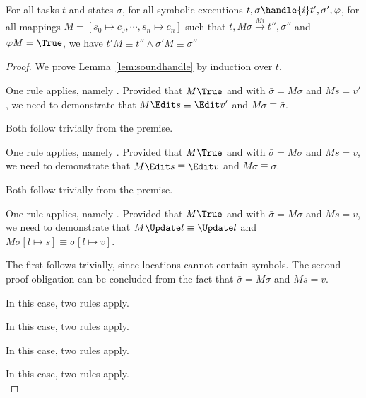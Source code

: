 \begin{lemma}
  \label{lem:soundhandle}

  For all tasks $t$ and states $\sigma$,
  for all symbolic executions $t,\sigma\handle{i} t',\sigma',\phi$,
  for all mappings $M = [s_0\mapsto c_0,\cdots,s_n\mapsto c_n]$
  such that $t,M \sigma \xrightarrow[]{M i} t'',\sigma''$ and $\phi M = \True$,
  we have $t'M \equiv t'' \wedge \sigma' M \equiv \sigma''$
\end{lemma}

\begin{proof}
  We prove Lemma~\ref{lem:soundhandle} by induction over $t$.\\

    {One rule applies, namely .
    Provided that $M\True$ and  with $\bar{\sigma}=M\sigma$ and $M s = v'$,
    we need to demonstrate that $M \Edit s\equiv \Edit v'$ and $ M\sigma\equiv \bar{\sigma}$.

    Both follow trivially from the premise.

    }

  {One rule applies, namely .
  Provided that $M\True$ and  with $\bar{\sigma}=M\sigma$ and $M s = v$,
  we need to demonstrate that $M \Edit s \equiv \Edit v$ and $ M\sigma\equiv \bar{\sigma}$.

  Both follow trivially from the premise.

  }

  {One rule applies, namely .
  Provided that $M\True$ and  with $\bar{\sigma}=M\sigma$ and $M s = v$,
  we need to demonstrate that $M \Update l \equiv \Update l$ and $ M\sigma[l\mapsto s]\equiv \bar{\sigma}[l\mapsto v]$.

  The first follows trivially, since locations cannot contain symbols. The second proof obligation can be concluded from the fact that $\bar{\sigma}=M\sigma$ and $M s = v$.

  }

  {In this case, two rules apply.\\
      {

      }
  }

  {

  }

  {
  In this case, two rules apply.\\
  }

  {
  In this case, two rules apply.\\
  }

  {
  In this case, two rules apply.\\
  }
\end{proof}


